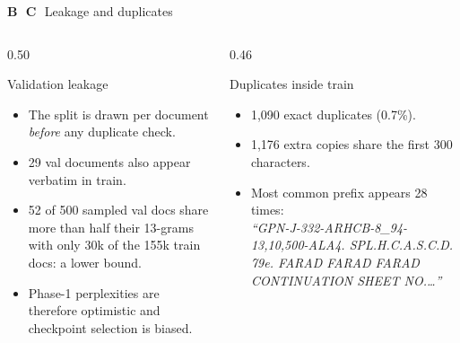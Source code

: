 \documentclass[aspectratio=169,11pt]{beamer}
\newcommand{\pb}[1]{\textbf{\textcolor{warm}{#1}}}   %
\begin{document}
\begin{frame}{\pb{B}\,\, \pb{C}\,\, Leakage and duplicates}
  \begin{columns}[T]
    \begin{column}{0.50\textwidth}
      \footnotesize
      \begin{block}{Validation leakage}
        \begin{itemize}
          \item The split is drawn per document \emph{before} any duplicate check.
          \item 29 val documents also appear verbatim in train.
          \item 52 of 500 sampled val docs share more than half their 13-grams with only 30k of the 155k train docs: a lower bound.
          \item Phase-1 perplexities are therefore optimistic and checkpoint selection is biased.
        \end{itemize}
      \end{block}
    \end{column}
    \begin{column}{0.46\textwidth}
      \footnotesize
      \begin{block}{Duplicates inside train}
        \begin{itemize}
          \item 1{,}090 exact duplicates (0.7\%).
          \item 1{,}176 extra copies share the first 300 characters.
          \item Most common prefix appears 28 times:\\
            \textit{``GPN-J-332-ARHCB-8\_94-13,10,500-ALA4. SPL.H.C.A.S.C.D. 79e. FARAD FARAD FARAD CONTINUATION SHEET NO.\ldots''}
        \end{itemize}
      \end{block}
    \end{column}
  \end{columns}
\end{frame}
\end{document}
